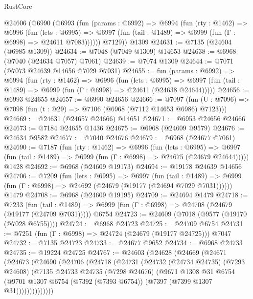 \begin{lexlean}{RustCore}
\begin{coremodule}
    @24606
      (@6990
        (@6993
          (fun (params : @6992) =>
          @6994
            (fun (rty : @1462) =>
            @6996
              (fun (lets : @6995) =>
              @6997 (fun (tail : @1489) => @6999 (fun (Γ : @6998) => @24611 @7083))))))
        @7129))
    @1309
@24631 := @7135 (@24604 (@6985 @1309))
@24634 := @7048 (@7049 @1309) @14653
@24638 := @6968 (@7040 (@24634 @7057) @7061)
@24639 := @7074 @1309
@24644 := @7071 (@7073 @24639 @14656 @7029 @7031)
@24655 := fun (params : @6992) =>
  @6994
    (fun (rty : @1462) =>
    @6996
      (fun (lets : @6995) =>
      @6997 (fun (tail : @1489) => @6999 (fun (Γ : @6998) => @24611 (@24638 @24644)))))
@24656 := @6993 @24655
@24657 := @6990 @24656
@24666 := @7097
    (fun (U : @7096) => @7098 (fun (t : @29) => @7106 (@6968 (@7112 @14653 @6986) @7123)))
@24669 := @24631 (@24657 @24666) @14651
@24671 := @6953 @24656 @24666
@24673 := @7184 @24655 @1436
@24675 := @6968 (@24609 @9579)
@24676 := @24634 @9582
@24677 := @7040 @24676
@24679 := @6968 (@24677 @7061)
@24690 := @7187
    (fun (rty : @1462) =>
    @6996
      (fun (lets : @6995) =>
      @6997 (fun (tail : @1489) => @6999 (fun (Γ : @6998) => @24675 (@24679 @24644)))))
    @1428
@24692 := @6968 (@24609 @19173)
@24694 := @19178 @24639 @14656
@24706 := @7209
    (fun (lets : @6995) =>
    @6997
      (fun (tail : @1489) =>
      @6999 (fun (Γ : @6998) => @24692 (@24679 (@19177 (@24694 @7029 @7031))))))
    @1479
@24708 := @6968 (@24609 @19195)
@24709 := @24694 @1479
@24718 := @7233
    (fun (tail : @1489) => @6999 (fun (Γ : @6998) => @24708 (@24679 (@19177 (@24709 @7031)))))
    @6754
@24723 := @24609 (@7018 (@9577 (@19170 (@7028 @6755))))
@24724 := @6968 @24723
@24725 := @24709 @6754
@24731 := @7251 (fun (Γ : @6998) => @24724 (@24679 (@19177 @24725))) @7047
@24732 := @7135 @24723
@24733 := @24677 @9652
@24734 := @6968 @24733
@24735 := @19224 @24725
@24767 := @24603
    (@24628
      (@24669
        (@24671
          (@24673
            (@24690
              (@24706
                (@24718
                  (@24731
                    (@24732
                      (@24734 @24735)
                      (@7293 @24608)
                      (@7135
                        @24733
                        @24735
                        (@7298 @24676)
                        (@9671
                          @1308
                          @31
                          @6754
                          (@9701
                            @1307
                            @6754
                            (@7392 (@7393 @6754))
                            (@7397 (@7399 @1307 @31))))))))))))))

\end{coremodule}
\end{lexlean}
